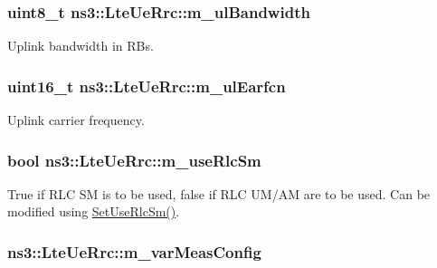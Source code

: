 \subsubsection[{\texorpdfstring{m\+\_\+ul\+Bandwidth}{m_ulBandwidth}}]{\setlength{\rightskip}{0pt plus 5cm}uint8\+\_\+t ns3\+::\+Lte\+Ue\+Rrc\+::m\+\_\+ul\+Bandwidth\hspace{0.3cm}{\ttfamily [private]}}\hypertarget{classns3_1_1LteUeRrc_a6ae2139e198c3ae86b03d2564a4e8c2a}{}\label{classns3_1_1LteUeRrc_a6ae2139e198c3ae86b03d2564a4e8c2a}
Uplink bandwidth in R\+Bs. 
\subsubsection[{\texorpdfstring{m\+\_\+ul\+Earfcn}{m_ulEarfcn}}]{\setlength{\rightskip}{0pt plus 5cm}uint16\+\_\+t ns3\+::\+Lte\+Ue\+Rrc\+::m\+\_\+ul\+Earfcn\hspace{0.3cm}{\ttfamily [private]}}\hypertarget{classns3_1_1LteUeRrc_a6ff890b601bbc956914219d51adef66f}{}\label{classns3_1_1LteUeRrc_a6ff890b601bbc956914219d51adef66f}
Uplink carrier frequency. 
\subsubsection[{\texorpdfstring{m\+\_\+use\+Rlc\+Sm}{m_useRlcSm}}]{\setlength{\rightskip}{0pt plus 5cm}bool ns3\+::\+Lte\+Ue\+Rrc\+::m\+\_\+use\+Rlc\+Sm\hspace{0.3cm}{\ttfamily [private]}}\hypertarget{classns3_1_1LteUeRrc_a724b0f4009ef95b569c52afb344fd5ae}{}\label{classns3_1_1LteUeRrc_a724b0f4009ef95b569c52afb344fd5ae}
True if R\+LC SM is to be used, false if R\+LC U\+M/\+AM are to be used. Can be modified using \hyperlink{classns3_1_1LteUeRrc_a32c86230a47f4bc2960944360e0acf36}{Set\+Use\+Rlc\+Sm()}. 
\subsubsection[{\texorpdfstring{m\+\_\+var\+Meas\+Config}{m_varMeasConfig}}]{ ns3\+::\+Lte\+Ue\+Rrc\+::m\+\_\+var\+Meas\+Config\hspace{0.3cm}{\ttfamily [private]}}\hypertarget{classns3_1_1LteUeRrc_a27a7773eedfdab964d2514d9eeb1c562}{}\label{classns3_1_1LteUeRrc_a27a7773eedfdab964d2514d9eeb1c562}


